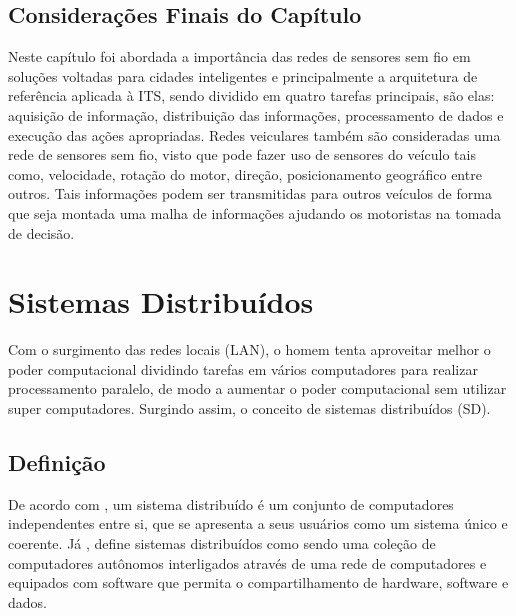 \documentclass[
	12pt,				%
	oneside,			%
	a4paper,			%
	english,			%
	brazil				%
	]{abntex2ppgsi}
\begin{document}

\section{Considerações Finais do Capítulo}

Neste capítulo foi abordada a importância das redes de sensores sem fio em soluções voltadas para cidades inteligentes e principalmente  a arquitetura de referência aplicada à ITS, sendo dividido em quatro tarefas principais, são elas: aquisição de informação, distribuição das informações,  processamento de dados e execução das ações apropriadas. Redes veiculares também são consideradas uma rede de sensores sem fio, visto que pode fazer uso de sensores do veículo tais como, velocidade, rotação do motor, direção, posicionamento geográfico entre outros. Tais informações podem ser transmitidas para outros veículos de forma que seja montada uma malha de informações ajudando os motoristas na tomada de decisão.

\chapter{Sistemas Distribuídos}

Com o surgimento das redes locais (LAN), o homem tenta aproveitar melhor o poder computacional dividindo tarefas em vários computadores para realizar processamento paralelo, de modo a aumentar o poder computacional sem utilizar super computadores. Surgindo assim, o conceito de sistemas distribuídos (SD).

\section{Definição}

De acordo com , um sistema distribuído é um conjunto de computadores independentes entre si, que se apresenta a seus usuários como um sistema único e coerente. Já  , define sistemas distribuídos como sendo uma coleção de computadores autônomos interligados através de uma rede de computadores e equipados com software que permita o compartilhamento de hardware, software e dados.
\end{document}
